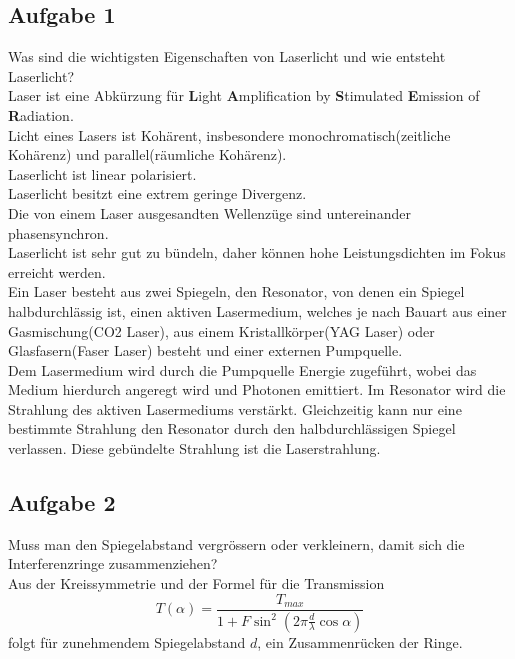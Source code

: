 \documentclass[a4paper,10pt]{scrartcl}
\begin{document}
	\subsection{Aufgabe 1}
	Was sind die wichtigsten Eigenschaften von Laserlicht und wie entsteht Laserlicht? \\
	Laser ist eine Abkürzung für \textbf Light \textbf Amplification by \textbf Stimulated \textbf Emission of \textbf Radiation.\\
	Licht eines Lasers ist Kohärent, insbesondere monochromatisch(zeitliche Kohärenz) und parallel(räumliche Kohärenz).\\
	Laserlicht ist linear polarisiert.\\
	Laserlicht besitzt eine extrem geringe Divergenz.\\
	Die von einem Laser ausgesandten Wellenzüge sind untereinander phasensynchron.\\
	Laserlicht ist sehr gut zu bündeln, daher können hohe Leistungsdichten im Fokus erreicht werden.\\
	Ein Laser besteht aus zwei Spiegeln, den Resonator, von denen ein Spiegel halbdurchlässig ist, einen aktiven Lasermedium, welches je nach Bauart aus einer Gasmischung(CO2 Laser), aus einem Kristallkörper(YAG Laser) oder Glasfasern(Faser Laser) besteht und einer externen Pumpquelle.\\
	Dem Lasermedium wird durch die Pumpquelle Energie zugeführt, wobei das Medium hierdurch angeregt wird und Photonen emittiert. Im Resonator wird die Strahlung des aktiven Lasermediums verstärkt. Gleichzeitig kann nur eine bestimmte Strahlung den Resonator durch den halbdurchlässigen Spiegel verlassen. Diese gebündelte Strahlung ist die Laserstrahlung.\\
	\subsection{Aufgabe 2}
	Muss man den Spiegelabstand vergrössern oder verkleinern, damit sich die Interferenzringe
	zusammenziehen?\\
	Aus der Kreissymmetrie und der Formel für die Transmission
	\[
	T(\alpha)=\frac{T_{max}}{1+F\sin^{2}(2 \pi\frac{d}{\lambda}\cos\alpha)}
	\]
	folgt für zunehmendem Spiegelabstand $d$, ein Zusammenrücken der Ringe.\\
\end{document}
